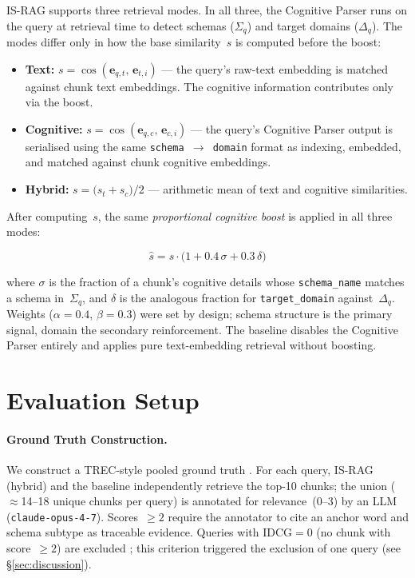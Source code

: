 \documentclass[11pt,a4paper]{article}
\begin{document}
IS-RAG supports three retrieval modes.
In all three, the Cognitive Parser runs on the query at retrieval time
to detect schemas ($\Sigma_q$) and target domains ($\Delta_q$).
The modes differ only in how the base similarity~$s$ is computed
before the boost:

\begin{itemize}[noitemsep,topsep=2pt]
  \item \textbf{Text:} $s = \cos(\mathbf{e}_{q,t},\,\mathbf{e}_{t,i})$
        — the query's raw-text embedding is matched against chunk text
        embeddings.  The cognitive information contributes only via the
        boost.
  \item \textbf{Cognitive:} $s = \cos(\mathbf{e}_{q,c},\,\mathbf{e}_{c,i})$
        — the query's Cognitive Parser output is serialised using the
        same \texttt{schema\,$\to$\,domain} format as indexing,
        embedded, and matched against chunk cognitive embeddings.
  \item \textbf{Hybrid:} $s = \bigl(s_t + s_c\bigr)/2$
        — arithmetic mean of text and cognitive similarities.
\end{itemize}

After computing~$s$, the same \emph{proportional cognitive boost} is
applied in all three modes:

\begin{equation}
  \label{eq:boosting}
  \hat{s} = s \cdot \bigl(1 + 0.4\,\sigma + 0.3\,\delta\bigr)
\end{equation}

\noindent where $\sigma$ is the fraction of a chunk's cognitive
details whose \texttt{schema\_name} matches a schema in~$\Sigma_q$,
and $\delta$ is the analogous fraction for \texttt{target\_domain}
against~$\Delta_q$.
Weights ($\alpha{=}0.4$, $\beta{=}0.3$) were set by design; schema
structure is the primary signal, domain the secondary reinforcement.
The baseline disables the Cognitive Parser entirely and applies pure
text-embedding retrieval without boosting.

\section{Evaluation Setup}
\label{sec:eval}

\paragraph{Ground Truth Construction.}
We construct a TREC-style pooled ground truth
\citep{voorhees2005}.
For each query, IS-RAG (hybrid) and the baseline independently
retrieve the top-10 chunks; the union ($\approx$14--18 unique chunks
per query) is annotated for relevance~(0--3) by an LLM
(\texttt{claude-opus-4-7}).
Scores~$\geq 2$ require the annotator to cite an anchor word and
schema subtype as traceable evidence.
Queries with IDCG$=0$ (no chunk with score~$\geq 2$) are excluded
\citep{buckley2004}; this criterion triggered the exclusion of one
query (see \S\ref{sec:discussion}).
\end{document}
